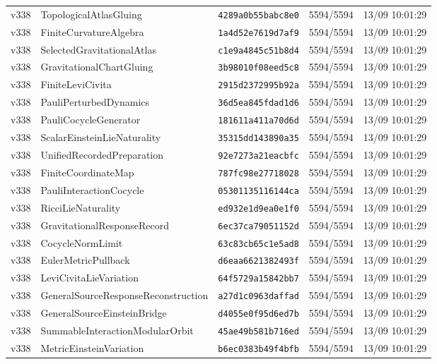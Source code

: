 \documentclass[11pt]{article}
\theoremstyle{definition}\newtheorem{deriv}{Derivation}
\begin{document}
{\begin{longtable}{@{}lllll@{}}
v338 & TopologicalAtlasGluing & \texttt{4289a0b55babc8e0} & 5594/5594 & 13/09 10:01:29 \\
v338 & FiniteCurvatureAlgebra & \texttt{1a4d52e7619d7af9} & 5594/5594 & 13/09 10:01:29 \\
v338 & SelectedGravitationalAtlas & \texttt{c1e9a4845c51b8d4} & 5594/5594 & 13/09 10:01:29 \\
v338 & GravitationalChartGluing & \texttt{3b98010f08eed5c8} & 5594/5594 & 13/09 10:01:29 \\
v338 & FiniteLeviCivita & \texttt{2915d2372995b92a} & 5594/5594 & 13/09 10:01:29 \\
v338 & PauliPerturbedDynamics & \texttt{36d5ea845fdad1d6} & 5594/5594 & 13/09 10:01:29 \\
v338 & PauliCocycleGenerator & \texttt{181611a411a70d6d} & 5594/5594 & 13/09 10:01:29 \\
v338 & ScalarEinsteinLieNaturality & \texttt{35315dd143890a35} & 5594/5594 & 13/09 10:01:29 \\
v338 & UnifiedRecordedPreparation & \texttt{92e7273a21eacbfc} & 5594/5594 & 13/09 10:01:29 \\
v338 & FiniteCoordinateMap & \texttt{787fc98e27718028} & 5594/5594 & 13/09 10:01:29 \\
v338 & PauliInteractionCocycle & \texttt{05301135116144ca} & 5594/5594 & 13/09 10:01:29 \\
v338 & RicciLieNaturality & \texttt{ed932e1d9ea0e1f0} & 5594/5594 & 13/09 10:01:29 \\
v338 & GravitationalResponseRecord & \texttt{6ec37ca79051152d} & 5594/5594 & 13/09 10:01:29 \\
v338 & CocycleNormLimit & \texttt{63c83cb65c1e5ad8} & 5594/5594 & 13/09 10:01:29 \\
v338 & EulerMetricPullback & \texttt{d6eaa6621382493f} & 5594/5594 & 13/09 10:01:29 \\
v338 & LeviCivitaLieVariation & \texttt{64f5729a15842bb7} & 5594/5594 & 13/09 10:01:29 \\
v338 & GeneralSourceResponseReconstruction & \texttt{a27d1c0963daffad} & 5594/5594 & 13/09 10:01:29 \\
v338 & GeneralSourceEinsteinBridge & \texttt{d4055e0f95d6ed7b} & 5594/5594 & 13/09 10:01:29 \\
v338 & SummableInteractionModularOrbit & \texttt{45ae49b581b716ed} & 5594/5594 & 13/09 10:01:29 \\
v338 & MetricEinsteinVariation & \texttt{b6ec0383b49f4bfb} & 5594/5594 & 13/09 10:01:29 \\

\end{longtable}}
\end{document}
